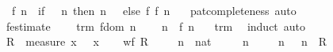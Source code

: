 \begin{isabellebody}
\begin{figure}
\begin{minipage}{0.8\textwidth}
\isanewline
\ \ {\isachardoublequoteopen}f{}{}\ n\ {\isacharequal}\ {\isacharparenleft}if\ {}{}{}\ {\isacharless}\ n\ then\ n\ {\isacharminus}\ {}{}\ else\ f{}{}\ {\isacharparenleft}f{}{}\ {\isacharparenleft}n\ {\isacharplus}\ {}{}{\isacharparenright}{\isacharparenright}{\isacharparenright}{\isachardoublequoteclose}\isanewline
%
\isadelimproof
%
\endisadelimproof
%
\isatagproof
{}\isamarkupfalse%
\ pat{\isacharunderscore}completeness\ auto%
\endisatagproof
{\isafoldproof}%
%
\isadelimproof
\isanewline
%
\endisadelimproof
\isanewline
{}\isamarkupfalse%
\ f{}{}{\isacharunderscore}estimate{\isacharcolon}\ \isanewline
\ \ \ trm{\isacharcolon}\ {\isachardoublequoteopen}f{}{}{\isacharunderscore}dom\ n{\isachardoublequoteclose}\ \isanewline
\ \ \ {\isachardoublequoteopen}n\ {\isacharless}\ f{}{}\ n\ {\isacharplus}\ {}{}{\isachardoublequoteclose}\isanewline
%
\isadelimproof
%
\endisadelimproof
%
\isatagproof
{}\isamarkupfalse%
\ trm\ \isamarkupfalse%
\ induct\ auto%
\endisatagproof
{\isafoldproof}%
%
\isadelimproof
\isanewline
%
\endisadelimproof
\isanewline
{}\isamarkupfalse%
\isanewline
%
\isadelimproof
%
\endisadelimproof
%
\isatagproof
{}\isamarkupfalse%
\isanewline
\ \ \isamarkupfalse%
\ {\isacharquery}R\ {\isacharequal}\ {\isachardoublequoteopen}measure\ {\isacharparenleft}{\isasymlambda}x{\isachardot}\ {}{}{}\ {\isacharminus}\ x{\isacharparenright}{\isachardoublequoteclose}\isanewline
\ \ \isamarkupfalse%
\ {\isachardoublequoteopen}wf\ {\isacharquery}R{\isachardoublequoteclose}\ \isacommand{{\isachardot}{\isachardot}}\isamarkupfalse%
\isanewline
\isanewline
\ \ \isamarkupfalse%
\ n\ {\isacharcolon}{\isacharcolon}\ nat\ \isamarkupfalse%
\ {\isachardoublequoteopen}{\isasymnot}\ {}{}{}\ {\isacharless}\ n{\isachardoublequoteclose}\ %
\isanewline
\isanewline
\ \ \isamarkupfalse%
\ {\isachardoublequoteopen}{\isacharparenleft}n\ {\isacharplus}\ {}{}{\isacharcomma}\ n{\isacharparenright}\ {\isasymin}\ {\isacharquery}R{\isachardoublequoteclose}\ \isamarkupfalse%

\end{minipage}
\end{figure}
\end{isabellebody}
